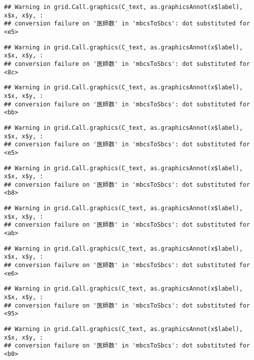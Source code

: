 \documentclass[
]{article}
\begin{document}
\begin{verbatim}
## Warning in grid.Call.graphics(C_text, as.graphicsAnnot(x$label), x$x, x$y, :
## conversion failure on '医師数' in 'mbcsToSbcs': dot substituted for <e5>
\end{verbatim}

\begin{verbatim}
## Warning in grid.Call.graphics(C_text, as.graphicsAnnot(x$label), x$x, x$y, :
## conversion failure on '医師数' in 'mbcsToSbcs': dot substituted for <8c>
\end{verbatim}

\begin{verbatim}
## Warning in grid.Call.graphics(C_text, as.graphicsAnnot(x$label), x$x, x$y, :
## conversion failure on '医師数' in 'mbcsToSbcs': dot substituted for <bb>
\end{verbatim}

\begin{verbatim}
## Warning in grid.Call.graphics(C_text, as.graphicsAnnot(x$label), x$x, x$y, :
## conversion failure on '医師数' in 'mbcsToSbcs': dot substituted for <e5>
\end{verbatim}

\begin{verbatim}
## Warning in grid.Call.graphics(C_text, as.graphicsAnnot(x$label), x$x, x$y, :
## conversion failure on '医師数' in 'mbcsToSbcs': dot substituted for <b8>
\end{verbatim}

\begin{verbatim}
## Warning in grid.Call.graphics(C_text, as.graphicsAnnot(x$label), x$x, x$y, :
## conversion failure on '医師数' in 'mbcsToSbcs': dot substituted for <ab>
\end{verbatim}

\begin{verbatim}
## Warning in grid.Call.graphics(C_text, as.graphicsAnnot(x$label), x$x, x$y, :
## conversion failure on '医師数' in 'mbcsToSbcs': dot substituted for <e6>
\end{verbatim}

\begin{verbatim}
## Warning in grid.Call.graphics(C_text, as.graphicsAnnot(x$label), x$x, x$y, :
## conversion failure on '医師数' in 'mbcsToSbcs': dot substituted for <95>
\end{verbatim}

\begin{verbatim}
## Warning in grid.Call.graphics(C_text, as.graphicsAnnot(x$label), x$x, x$y, :
## conversion failure on '医師数' in 'mbcsToSbcs': dot substituted for <b0>
\end{verbatim}
\end{document}
